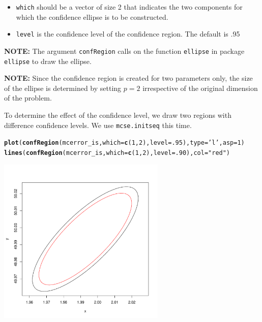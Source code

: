 \documentclass[11pt]{article}\usepackage[]{graphicx}\usepackage[]{color}
\makeatletter
\def\maxwidth{ %
  \ifdim\Gin@nat@width>\linewidth
    \linewidth
  \else
    \Gin@nat@width
  \fi
}
\newcommand{\hlnum}[1]{\textcolor[rgb]{0.686,0.059,0.569}{#1}}%
\newcommand{\hlstr}[1]{\textcolor[rgb]{0.192,0.494,0.8}{#1}}%
\newcommand{\hlstd}[1]{\textcolor[rgb]{0.345,0.345,0.345}{#1}}%
\newcommand{\hlkwc}[1]{\textcolor[rgb]{0.333,0.667,0.333}{#1}}%
\newcommand{\hlkwd}[1]{\textcolor[rgb]{0.737,0.353,0.396}{\textbf{#1}}}%
\newenvironment{kframe}{%
 \def\at@end@of@kframe{}%
 \ifinner\ifhmode%
  \def\at@end@of@kframe{\end{minipage}}%
  \begin{minipage}{\columnwidth}%
 \fi\fi%
 \def\FrameCommand##1{\hskip\@totalleftmargin \hskip-\fboxsep
 \colorbox{shadecolor}{##1}\hskip-\fboxsep
     \hskip-\linewidth \hskip-\@totalleftmargin \hskip\columnwidth}%
 \MakeFramed {\advance\hsize-\width
   \@totalleftmargin\z@ \linewidth\hsize
   \@setminipage}}%
 {\par\unskip\endMakeFramed%
 \at@end@of@kframe}
\newenvironment{knitrout}{}{} %
\makeatother
\begin{document}
\begin{itemize}
	\item \texttt{which} should be a vector of size 2 that indicates the two components for which the confidence ellipse is to be constructed.

	\item \texttt{level} is the confidence level of the confidence region. The default is .95
\end{itemize}

\bigskip
\textbf{NOTE: }The argument  \texttt{confRegion} calls on the function \texttt{ellipse} in package \texttt{ellipse} to draw the ellipse.

\bigskip
\textbf{NOTE: } Since the confidence region is created for two parameters only, the size of the ellipse is determined by setting $p = 2$ irrespective of the original dimension of the problem.

\bigskip
To determine the effect of the confidence level, we draw two regions with difference confidence levels. We use \texttt{mcse.initseq} this time.

\begin{knitrout}
\color{fgcolor}\begin{kframe}
\begin{alltt}
\hlkwd{plot}\hlstd{(}\hlkwd{confRegion}\hlstd{(mcerror_is,} \hlkwc{which} \hlstd{=} \hlkwd{c}\hlstd{(}\hlnum{1}\hlstd{,}\hlnum{2}\hlstd{),} \hlkwc{level} \hlstd{=} \hlnum{.95}\hlstd{),} \hlkwc{type} \hlstd{=} \hlstr{'l'}\hlstd{,} \hlkwc{asp} \hlstd{=} \hlnum{1}\hlstd{)}
\hlkwd{lines}\hlstd{(}\hlkwd{confRegion}\hlstd{(mcerror_is,} \hlkwc{which} \hlstd{=} \hlkwd{c}\hlstd{(}\hlnum{1}\hlstd{,}\hlnum{2}\hlstd{),} \hlkwc{level} \hlstd{=} \hlnum{.90}\hlstd{),} \hlkwc{col} \hlstd{=} \hlstr{"red"}\hlstd{)}
\end{alltt}
\end{kframe}
\includegraphics[width=\maxwidth,height=8cm]{figure/comp_region-1} 

\end{knitrout}
\end{document}

